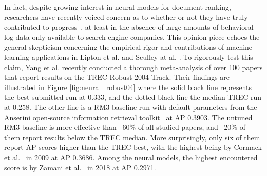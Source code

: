 In fact, despite growing interest in neural models for document ranking, researchers have recently voiced concern as to whether or not they have truly contributed to progress~\cite{lin2019neural}, at least in the absence of large amounts of behavioral log data only available to search engine companies.
This opinion piece echoes the general skepticism concerning the empirical rigor and contributions of machine learning applications in Lipton et al. \cite{lipton2018troubling} and Sculley at al. \cite{sculley2018winner}.
To rigorously test this claim, Yang et al. \cite{Yang_etal_SIGIR2019} recently conducted a thorough meta-analysis of over 100 papers that report results on the TREC Robust 2004 Track.
Their findings are illustrated in Figure \ref{fig:neural_robust04} where the solid black line represents the best submitted run at 0.333, and the dotted black line the median TREC run at 0.258.
The other line is a RM3 baseline run with default parameters from the Anserini open-source information retrieval toolkit~\cite{Yang:2018:ARR:3289400.3239571} at AP 0.3903.
The untuned RM3 baseline is more effective than ~60\% of all studied papers, and ~20\% of them report results below the TREC median.
More surprisingly, only six of them report AP scores higher than the TREC best, with the highest being by Cormack et al.~\cite{Cormack:2009:RRF:1571941.1572114} in 2009 at AP 0.3686.
Among the neural models, the highest encountered score is by Zamani et al.~\cite{zamani2018neural} in 2018 at AP 0.2971.

